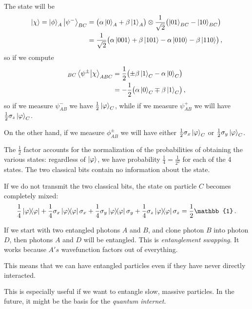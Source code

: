 \documentclass[main.tex]{subfiles}
\begin{document}
The state will be 
%
\begin{align}
\ket{\chi } = 
  \ket{\phi}_{A} \ket{\psi^{-}}_{BC}
 &= \qty(\alpha \ket{0}_{A} + \beta \ket{1}_{A} )
 \otimes 
 \frac{1}{\sqrt{2}} \qty(\ket{01}_{BC} - \ket{10}_{BC}) \\
 &= \frac{1}{\sqrt{2}} \qty(\alpha \ket{001} + \beta \ket{101} - \alpha \ket{010} - \beta \ket{110})
\,,
\end{align}
%
so if we compute 
%
\begin{align}
_{BC}\braket{\psi^{\pm}}{\chi }_{ABC}
 &= \frac{1}{2} \qty( \pm \beta \ket{1}_{C} - \alpha \ket{0}_{C}) \\
&= -\frac{1}{2} \qty(\alpha \ket{0}_{C} \mp \beta \ket{1}_{C})
\,,
\end{align}
%
so if we measure \(\psi^{-}_{AB}\) we have \(\frac{1}{2} \ket{\varphi }_{C}\), while if we measure \(\psi^{+}_{AB}\) we will have \(\frac{1}{2} \sigma_{z} \ket{\varphi}_{C}\).

On the other hand, if we measure \(\phi^{\pm}_{AB}\) we will have either \(\frac{1}{2} \sigma_{x} \ket{\varphi}_{C}\) or \(\frac{1}{2} \sigma_{y} \ket{\varphi}_{C}\).

The \(\frac{1}{2}\) factor accounts for the normalization of the probabilities of obtaining the various states: regardless of \(\ket{\varphi }\), we have probability \(\frac{1}{4} = \frac{1}{2^2}\) for each of the 4 states. The two classical bits contain no information about the state. 

If we do not transmit the two classical bits, the state on particle \(C\) becomes completely mixed: 
%
\begin{align}
\frac{1}{4} \dyad{\varphi } + 
\frac{1}{4} \sigma_{x} \dyad{\varphi }\sigma_{x}  + 
\frac{1}{4} \sigma_{y} \dyad{\varphi }\sigma_{y}  + 
\frac{1}{4} \sigma_{z} \dyad{\varphi }\sigma_{z} =
\frac{1}{2} \mathbb{1} 
\,.
\end{align}

If we start with two entangled photons \(A\) and \(B\), and clone photon \(B\) into photon \(D\), then photons \(A\) and \(D\) will be entangled. 
This is \emph{entanglement swapping}. It works because \(A's\) wavefunction factors out of everything. 

This means that we can have entangled particles even if they have never directly interacted. 

This is especially useful if we want to entangle slow, massive particles. 
In the future, it might be the basis for the \emph{quantum internet}. 
\end{document}
